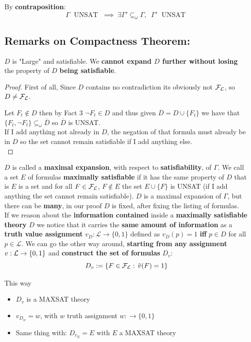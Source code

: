 	\newpage

	\noindent
	By \textbf{contraposition}:
	$$ \Gamma \; \text{ UNSAT } \; \implies \; \exists \Gamma ' \subseteq_\omega \Gamma, \;\; \Gamma' \; \text{ UNSAT } $$

	\subsection{Remarks on Compactness Theorem:}

	$D$ is "Large" and satisfiable. We \textbf{cannot expand $D$ further without losing} the property of $D$ \textbf{being satisfiable}.

	\begin{proof}
		First of all, Since $D$ contains no contradiction its obviously not $\mathcal{F}_\mathcal{L}$, so $D \neq \mathcal{F}_\mathcal{L}$.

		Let $F_t \notin D$ then by Fact 3 $\neg F_t \in D$ and thus given $\overline{D} = D \cup \{F_t\}$ we have that $\{F_t, \neg F_t\} \subseteq_\omega \overline{D}$ so $\overline{D}$ is UNSAT.\\
		If I add anything not already in $D$, the negation of that formula must already be in $D$ so the set cannot remain satisfiable if I add anything else.\\
	\end{proof}
	\noindent
	$D$ is called a \textbf{maximal expansion}, with respect to \textbf{satisfiability}, of $\Gamma$. We call a set $E$ of formulas \textbf{maximally satisfiable} if it has the same property of $D$ that is $E$ is a set and for all $F \in \mathcal{F}_\mathcal{L}$, $F \notin E$ the set $E \cup \{F\}$ is UNSAT (if I add anything the set cannot remain satisfiable).
	$D$ is a maximal expansion of $\Gamma$, but there can be \textbf{many}, in our proof $D$ is fixed, after fixing the listing of formulas.\\


	If we reason about the \textbf{information contained} inside a \textbf{maximally satisfiable theory} $D$ we notice that it carries the \textbf{same amount of information} as a \textbf{truth value assignment} $v_D : \mathcal{L} \rightarrow \{0,1\}$ defined as $v_D (p) = 1$ \textbf{iff} $p \in D$ for all $p \in \mathcal{L}$. We can go the other way around, \textbf{starting from any assignment} $v: \mathcal{L} \rightarrow \{0,1\}$ and \textbf{construct the set of formulas} $D_v$:
	$$ D_v := \{F \in \mathcal{F}_\mathcal{L} : \, \tilde{v} (F) = 1\}$$

	\noindent
	This way \vspace{-0.15cm}
	\begin{itemize}
		\item $D_v$ is a MAXSAT theory
		\item $v_{D_{w}} = w$, with $w$ truth assignment $w: \rightarrow \{0,1\}$
		\item Same thing with: $D_{v_E} = E$ with $E$ a MAXSAT theory
	\end{itemize}


